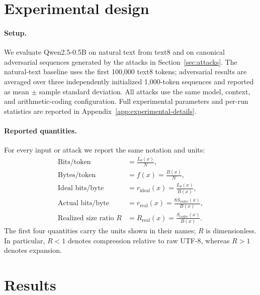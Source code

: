 \documentclass{article}
\begin{document}
\section{Experimental design}
\label{sec:design}

\paragraph{Setup.}
We evaluate Qwen2.5-0.5B on natural text from text8 and on canonical
adversarial sequences generated by the attacks in
Section~\ref{sec:attacks}. The natural-text baseline uses the first
100,000 text8 tokens; adversarial results are averaged over three
independently initialized 1,000-token sequences and reported as mean
$\pm$ sample standard deviation. All attacks use the same model,
context, and arithmetic-coding configuration. Full experimental
parameters and per-run statistics are reported in Appendix~\ref{app:experimental-details}.

\paragraph{Reported quantities.}
For every input or attack we report the same notation and units:
\begin{align}
  \text{Bits/token}
  &= \frac{L_\theta(x)}{N},
  \label{eq:reported-bpt}\\
  \text{Bytes/token}
  &= f(x)=\frac{B(x)}{N},
  \label{eq:reported-fertility}\\
  \text{Ideal bits/byte}
  &= r_{\mathrm{ideal}}(x)=\frac{L_\theta(x)}{B(x)},
  \label{eq:reported-ideal-bpb}\\
  \text{Actual bits/byte}
  &= r_{\mathrm{real}}(x)=\frac{8S_{\mathrm{codec}}(x)}{B(x)},
  \label{eq:reported-real-bpb}\\
  \text{Realized size ratio }R
  &= R_{\mathrm{real}}(x)=\frac{S_{\mathrm{codec}}(x)}{B(x)}.
  \label{eq:reported-ratio}
\end{align}
The first four quantities carry the units shown in their names; $R$ is dimensionless. In particular, $R<1$ denotes compression relative to raw UTF-8, whereas $R>1$ denotes expansion.




\section{Results}
\label{sec:results}
\end{document}
